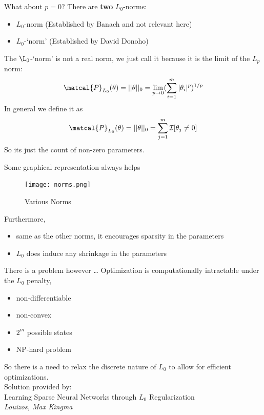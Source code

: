 \documentclass{beamer}
\begin{document}
\begin{frame}[t]{What about $p=0$?}
  There are \textbf{two} $L_0$-norms:
  \begin{itemize}
    \item $L_0$-norm (Established by Banach and not relevant here)
    \item $L_0$-`norm' (Established by David Donoho)
  \end{itemize}
  The $\L_0$-`norm' is not a real norm, we just call it because it is the limit of the $L_p$ norm:
  \begin{equation}
    \matcal{P}_{L_0}(\theta) = ||\theta||_0 = \lim_{p \rightarrow 0} (\sum^{m}_{i=1} |\theta_i|^{p})^{1/p}
  \end{equation}
  In general we define it as 
  \begin{equation}
    \matcal{P}_{L_0}(\theta) = ||\theta||_0 = \sum^{m}_{j=1} \mathcal{I}[\theta_j \neq 0]
  \end{equation}
  So its just the count of non-zero parameters.
\end{frame}

\begin{frame}[t]{Some graphical representation always helps}
  \begin{figure}[htpb]
    \centering
    \texttt{[image: norms.png]}
    \caption{Various Norms}\label{fig:norms}
  \end{figure} 
  Furthermore, 
  \begin{itemize}
    \item same as the other norms, it encourages sparsity in the parameters
    \item $L_0$ does induce any shrinkage in the parameters
  \end{itemize}
\end{frame}

\begin{frame}[t]{There is a problem however \ldots}
  Optimization is computationally intractable under the $L_0$ penalty,
  \begin{itemize}
    \item non-differentiable %
    \item non-convex
    \item $2^{m}$ possible states
    \item NP-hard problem
  \end{itemize}
  So there is a need to relax the discrete nature of $L_0$ to allow for efficient optimizations.
  \\
  Solution provided by:
  \\
  Learning Sparse Neural Networks through $L_0$ Regularization \\
  \emph{Louizos, Max Kingma} \\
\end{frame}
\end{document}
